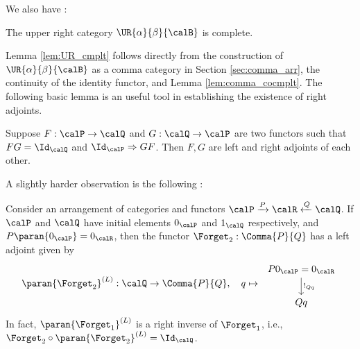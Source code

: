 \documentclass[12pt,oneside]{article}
\begin{document}
We also have :

\begin{lemma} \label{lem:UR_cmplt}
	The upper right category $\UR{\alpha}{\beta}{\calB}$ is complete.  
\end{lemma}

Lemma \ref{lem:UR_cmplt} follows directly from the construction of $\UR{\alpha}{\beta}{\calB}$ as a comma category in Section \ref{sec:comma_arr}, the continuity of the identity functor, and Lemma \ref{lem:comma_cocmplt}. The following basic lemma is an useful tool in establishing the existence of right adjoints. 

\begin{lemma}  \label{lem:RIRA}
	Suppose $F:\calP \to \calQ$ and $G:\calQ \to \calP$ are two functors such that $FG = \Id_{\calQ}$ and $\Id_{\calP} \Rightarrow GF$. Then $F,G$ are left and right adjoints of each other.
\end{lemma}


A slightly harder observation is the following : 

\begin{lemma} \label{lem:frgt_adjnt}
	Consider an arrangement of categories and functors $\calP \xrightarrow{P} \calR \xleftarrow{Q} \calQ$. If $\calP$ and $\calQ$ have initial elements $0_{\calP}$ and $1_{\calQ}$ respectively, and $P \paran{0_{\calP}} = 0_{\calR}$, then the functor $\Forget_2 : \Comma{P}{Q}$ has a left adjoint given by
	\[ \paran{ \Forget_2 }^{(L)} : \calQ \to \Comma{P}{Q}, \quad q \mapsto \; \begin{tikzcd} P 0_{\calP} = 0_{\calR} \arrow[d, "!_{Qq}"] \\ Qq \end{tikzcd} \]
	In fact, $\paran{ \Forget_1 }^{(L)}$ is a right inverse of $\Forget_1$, i.e., $\Forget_2 \circ \paran{ \Forget_2 }^{(L)} = \Id_{\calQ}$. 
\end{lemma}
\end{document}
